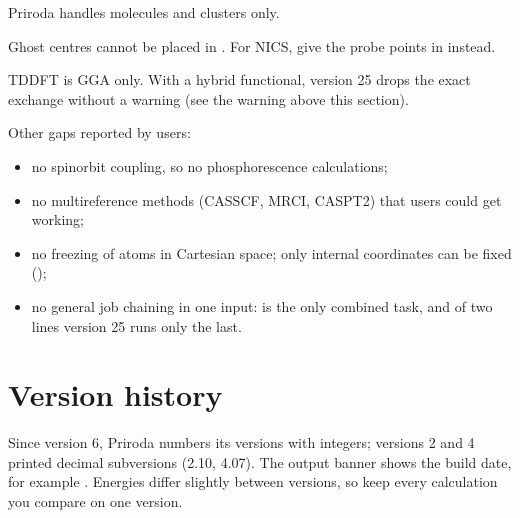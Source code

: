 \documentclass[letterpaper,10pt,english,openany,oneside]{sphinxmanual}
\begin{document}
\begin{description}
\sphinxAtStartPar
Priroda handles molecules and clusters only.



\sphinxAtStartPar
Ghost centres cannot be placed in . For NICS, give the probe points in
{\hyperref[\detokenize{reference/nmr:nmr-points}]{}} instead.



\sphinxAtStartPar
TDDFT is GGA only. With a hybrid functional, version 25 drops the exact exchange without a warning (see the
warning above this section). 

\end{description}

\sphinxAtStartPar
Other gaps reported by users:
\begin{itemize}
\item {} 
\sphinxAtStartPar
no spin\textendash{}orbit coupling, so no phosphorescence calculations; 

\item {} 
\sphinxAtStartPar
no multireference methods (CASSCF, MRCI, CASPT2) that users could get working; 

\item {} 
\sphinxAtStartPar
no freezing of atoms in Cartesian space; only internal coordinates can be fixed
({\hyperref[\detokenize{reference/optimize:optimize-fix}]{}}); 

\item {} 
\sphinxAtStartPar
no general job chaining in one input:  is the only combined task, and of two  lines
version 25 runs only the last. 

\end{itemize}


\section{Version history}
\label{\detokenize{start/about:version-history}}
\sphinxAtStartPar
Since version 6, Priroda numbers its versions with integers; versions 2 and 4 printed decimal sub\sphinxhyphen{}versions (2.10,
4.07). The output banner shows the build date, for example . Energies differ slightly
between versions, so keep every calculation you compare on one version.
\end{document}
